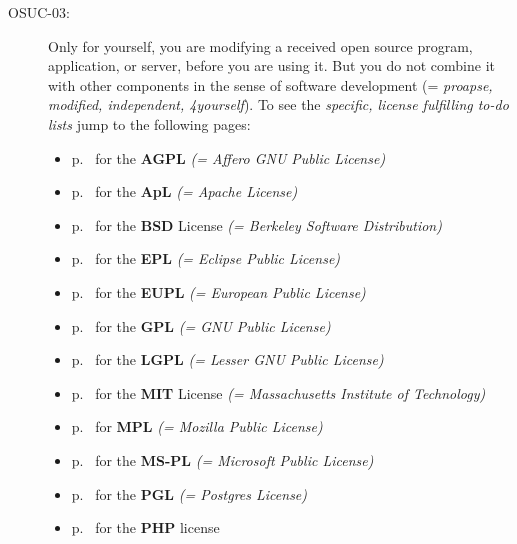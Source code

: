 \begin{description}
\item[OSUC-03:]\label{OSUC-03-DEF} Only for yourself, you are modifying a
received open source program, application, or server, before you are using it.
But you do not combine it with other components in the sense of software
development (= \textit{proapse, modified, independent, 4yourself}).
To see the \textit{specific, license fulfilling to-do lists} jump to the
following pages:
   \begin{itemize}
    \item p.\ \pageref{OSUC-03-AGPL} for the \textbf{AGPL}
      \textit{(= Affero GNU Public License)} 
    \item p.\ \pageref{OSUC-03-Apache20} for the \textbf{ApL}
      \textit{(= Apache License)}
    \item p.\ \pageref{OSUC-03-BSD} for the \textbf{BSD} License
      \textit{(= Berkeley Software Distribution)}
    \item p.\ \pageref{OSUC-03-EPL} for the \textbf{EPL}
      \textit{(= Eclipse Public License)}     
    \item p.\ \pageref{OSUC-03-EUPL} for the \textbf{EUPL}
      \textit{(= European Public License)} 
    \item p.\ \pageref{OSUC-03-GPL} for the \textbf{GPL}
       \textit{(= GNU Public License)} 
    \item p.\ \pageref{OSUC-03-LGPL} for the \textbf{LGPL}
      \textit{(= Lesser GNU Public License)}           
    \item p.\ \pageref{OSUC-03-MIT} for the \textbf{MIT} License
       \textit{(= Massachusetts Institute of Technology)} 
    \item p.\ \pageref{OSUC-03-MPL} for \textbf{MPL}
      \textit{(= Mozilla Public License)}     
    \item p.\ \pageref{OSUC-03-MS-PL} for the \textbf{MS-PL}
      \textit{(= Microsoft Public License)} 
    \item p.\ \pageref{OSUC-03-PGL} for the \textbf{PGL}
      \textit{(= Postgres License)} 
    \item p.\ \pageref{OSUC-03-PHP} for the \textbf{PHP} license 
  \end{itemize}


\end{description}
